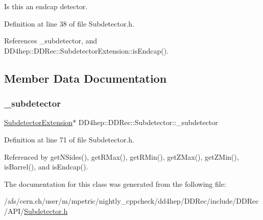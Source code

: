 Is this an endcap detector. 



Definition at line 38 of file Subdetector.\+h.



References \+\_\+subdetector, and D\+D4hep\+::\+D\+D\+Rec\+::\+Subdetector\+Extension\+::is\+Endcap().



\subsection{Member Data Documentation}
\hypertarget{class_d_d4hep_1_1_d_d_rec_1_1_subdetector_a5caedab984b0c8d6810eae5b85d238b1}{}\label{class_d_d4hep_1_1_d_d_rec_1_1_subdetector_a5caedab984b0c8d6810eae5b85d238b1} 
\subsubsection{\texorpdfstring{\+\_\+subdetector}{\_subdetector}}
{\footnotesize\ttfamily \hyperlink{class_d_d4hep_1_1_d_d_rec_1_1_subdetector_extension}{Subdetector\+Extension}$\ast$ D\+D4hep\+::\+D\+D\+Rec\+::\+Subdetector\+::\+\_\+subdetector\hspace{0.3cm}{\ttfamily [protected]}}



Definition at line 71 of file Subdetector.\+h.



Referenced by get\+N\+Sides(), get\+R\+Max(), get\+R\+Min(), get\+Z\+Max(), get\+Z\+Min(), is\+Barrel(), and is\+Endcap().



The documentation for this class was generated from the following file\+:\begin{DoxyCompactItemize}
\item 
/afs/cern.\+ch/user/m/mpetric/nightly\+\_\+cppcheck/dd4hep/\+D\+D\+Rec/include/\+D\+D\+Rec/\+A\+P\+I/\hyperlink{_subdetector_8h}{Subdetector.\+h}\end{DoxyCompactItemize}

